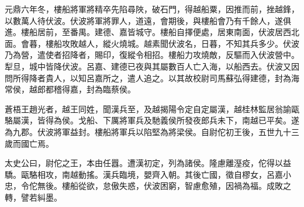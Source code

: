 元鼎六年冬，樓船將軍將精卒先陷尋陜，破石門，得越船粟，因推而前，挫越鋒，以數萬人待伏波。伏波將軍將罪人，道遠，會期後，與樓船會乃有千餘人，遂俱進。樓船居前，至番禺。建德、嘉皆城守。樓船自擇便處，居東南面，伏波居西北面。會暮，樓船攻敗越人，縱火燒城。越素聞伏波名，日暮，不知其兵多少。伏波乃為營，遣使者招降者，賜印，復縱令相招。樓船力攻燒敵，反驅而入伏波營中。犁旦，城中皆降伏波。呂嘉、建德已夜與其屬數百人亡入海，以船西去。伏波又因問所得降者貴人，以知呂嘉所之，遣人追之。以其故校尉司馬蘇弘得建德，封為海常侯，越郎都稽得嘉，封為臨蔡侯。

蒼梧王趙光者，越王同姓，聞漢兵至，及越揭陽令定自定屬漢，越桂林監居翁諭甌駱屬漢，皆得為侯。戈船、下厲將軍兵及馳義侯所發夜郎兵未下，南越已平矣。遂為九郡。伏波將軍益封。樓船將軍兵以陷堅為將梁侯。自尉佗初王後，五世九十三歲而國亡焉。

太史公曰，尉佗之王，本由任囂。遭漢初定，列為諸侯。隆慮離溼疫，佗得以益驕。甌駱相攻，南越動搖。漢兵臨境，嬰齊入朝。其後亡國，徵自樛女，呂嘉小忠，令佗無後。樓船從欲，怠傲失惑，伏波困窮，智慮愈殖，因禍為福。成敗之轉，譬若糾墨。